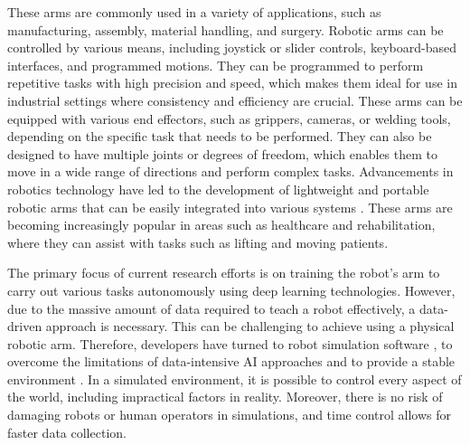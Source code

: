 \documentclass[12pt,oneside]{article}
\begin{document}
These arms are commonly used in a variety of applications, such as manufacturing, assembly, material handling, and surgery. Robotic arms can be controlled by various means, including joystick or slider controls, keyboard-based interfaces, and programmed motions. They can be programmed to perform repetitive tasks with high precision and speed, which makes them ideal for use in industrial settings where consistency and efficiency are crucial. These arms can be equipped with various end effectors, such as grippers, cameras, or welding tools, depending on the specific task that needs to be performed. They can also be designed to have multiple joints or degrees of freedom, which enables them to move in a wide range of directions and perform complex tasks. Advancements in robotics technology have led to the development of lightweight and portable robotic arms that can be easily integrated into various systems \cite{11_singh2013evolution}. These arms are becoming increasingly popular in areas such as healthcare and rehabilitation, where they can assist with tasks such as lifting and moving patients.

The primary focus of current research efforts is on training the robot’s arm to carry out various tasks autonomously using deep learning technologies. However, due to the massive amount of data required to teach a robot effectively, a data-driven approach is necessary. This can be challenging to achieve using a physical robotic arm. Therefore, developers have turned to robot simulation software \cite{12_oRobotics}, \cite{13_pybullet} to overcome the limitations of data-intensive AI approaches and to provide a stable environment \cite{14_banks1999introduction}. In a simulated environment, it is possible to control every aspect of the world, including impractical factors in reality. Moreover, there is no risk of damaging robots or human operators in simulations, and time control allows for faster data collection.
\end{document}

